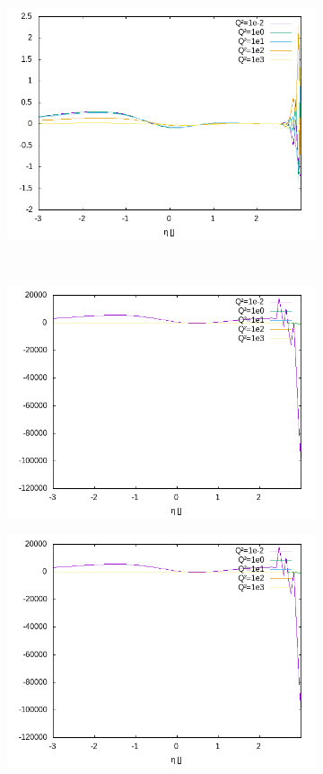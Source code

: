 \begin{figure}[ht!]
\begin{subfigure}[t]{.3\textwidth}
	\includegraphics[width=\textwidth]{../../img2/partonic/cg1_VV_x2g1}
\end{subfigure}\\%
\begin{subfigure}[t]{.3\textwidth}
	\includegraphics[width=\textwidth]{../../img2/partonic/cg1_AA_F2}
\end{subfigure}%
\begin{subfigure}[t]{.3\textwidth}
	\includegraphics[width=\textwidth]{../../img2/partonic/cg1_AA_FL}

\end{subfigure}
\end{figure}

